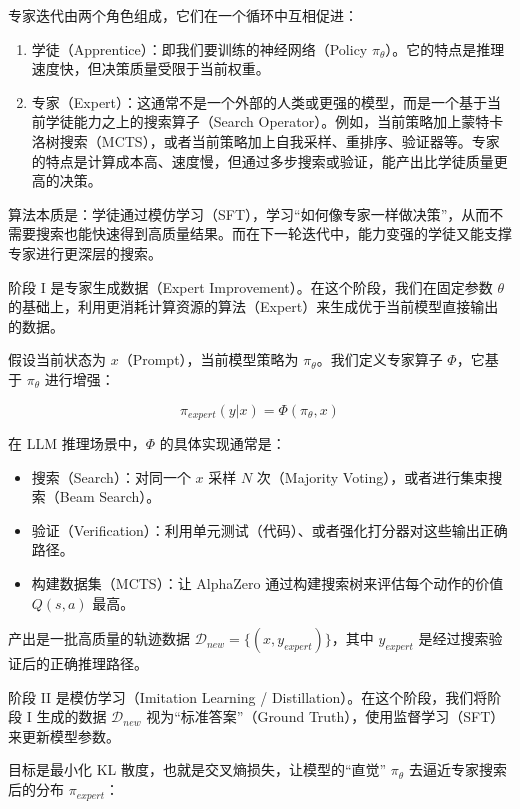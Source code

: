 专家迭代由两个角色组成，它们在一个循环中互相促进：

\begin{enumerate}
\def\labelenumi{\arabic{enumi}.}
\tightlist
\item
  学徒（Apprentice）：即我们要训练的神经网络（Policy \(\pi_\theta\)）。它的特点是推理速度快，但决策质量受限于当前权重。
\item
  专家（Expert）：这通常不是一个外部的人类或更强的模型，而是一个基于当前学徒能力之上的搜索算子（Search Operator）。例如，当前策略加上蒙特卡洛树搜索（MCTS），或者当前策略加上自我采样、重排序、验证器等。专家的特点是计算成本高、速度慢，但通过多步搜索或验证，能产出比学徒质量更高的决策。
\end{enumerate}

算法本质是：学徒通过模仿学习（SFT），学习``如何像专家一样做决策''，从而不需要搜索也能快速得到高质量结果。而在下一轮迭代中，能力变强的学徒又能支撑专家进行更深层的搜索。

阶段 I 是专家生成数据（Expert Improvement）。在这个阶段，我们在固定参数 \(\theta\) 的基础上，利用更消耗计算资源的算法（Expert）来生成优于当前模型直接输出的数据。

假设当前状态为 \(x\)（Prompt），当前模型策略为 \(\pi_\theta\)。我们定义专家算子 \(\Phi\)，它基于 \(\pi_\theta\) 进行增强：

\[
\pi_{expert}(y|x)=\Phi(\pi_\theta,x)
\]

在 LLM 推理场景中，\(\Phi\) 的具体实现通常是：

\begin{itemize}
\tightlist
\item
  搜索（Search）：对同一个 \(x\) 采样 \(N\) 次（Majority Voting），或者进行集束搜索（Beam Search）。
\item
  验证（Verification）：利用单元测试（代码）、或者强化打分器对这些输出正确路径。
\item
  构建数据集（MCTS）：让 AlphaZero 通过构建搜索树来评估每个动作的价值 \(Q(s,a)\) 最高。
\end{itemize}

产出是一批高质量的轨迹数据 \(\mathcal{D}_{new}=\{(x,y_{expert})\}\)，其中 \(y_{expert}\) 是经过搜索验证后的正确推理路径。

阶段 II 是模仿学习（Imitation Learning / Distillation）。在这个阶段，我们将阶段 I 生成的数据 \(\mathcal{D}_{new}\) 视为``标准答案''（Ground Truth），使用监督学习（SFT）来更新模型参数。

目标是最小化 KL 散度，也就是交叉熵损失，让模型的``直觉'' \(\pi_\theta\) 去逼近专家搜索后的分布 \(\pi_{expert}\)：

